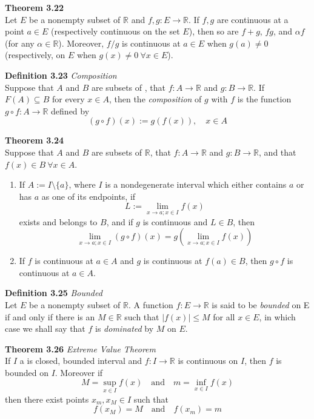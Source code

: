 \documentclass[8pt,landscape]{article}
\begin{document}
\begin{multicols}{3}
    \textbf{Theorem 3.22} \\
    Let $E$ be a nonempty subset of $\mathbb{R}$ and $f, g : E \to \mathbb{R}$.
    If $f, g$ are continuous at a point $a \in E$ (respectively continuous on the set $E$),
    then so are $f+g$, $fg$, and $\alpha f$ (for any $\alpha \in \mathbb{R}$).
    Moreover, $f/g$ is continuous at $a \in E$ when $g(a) \neq 0$
    (respectively, on $E$ when $g(x) \neq 0\ \forall x \in E$).

    \textbf{Definition 3.23} \emph{Composition} \\
    Suppose that $A$ and $B$ are subsets of , that $f : A \to \mathbb{R}$
    and $g : B \to \mathbb{R}$.
    If $F(A) \subseteq B$ for every $x \in A$, then the \emph{composition} of $g$ with $f$
    is the function $g \circ f : A \to \mathbb{R}$ defined by
    \[
        (g \circ f) (x) := g(f(x)), \quad x \in A
    \]

    \textbf{Theorem 3.24} \\
    Suppose that $A$ and $B$ are subsets of $\mathbb{R}$, that $f : A \to \mathbb{R}$
    and $g : B \to \mathbb{R}$, and that $f(x) \in B \ \forall x \in A$.
    \begin{enumerate}
        \item If $A := I \setminus \{a\}$, where $I$ is a nondegenerate interval which
            either contains $a$ or has $a$ as one of its endpoints, if
            \[
                L := \lim_{x \to a; x \in I} f(x)
            \]
            exists and belongs to $B$, and if $g$ is continuous and $L \in B$, then
            \[
                \lim_{x \to a; x \in I} (g \circ f) (x) =
                g \left( \lim_{x \to a; x \in I} f(x)\right)
            \]
        \item If $f$ is continuous at $a \in A$ and $g$ is continuous at $f(a) \in B$,
            then $g \circ f$ is continuous at $a \in A$.
    \end{enumerate}

    \textbf{Definition 3.25} \emph{Bounded} \\
    Let $E$ be a nonempty subset of $\mathbb{R}$.
    A function $f : E \to \mathbb{R}$ is said to be \emph{bounded} on E if and only if
    there is an $M \in \mathbb{R}$ such that $|f(x)| \leq M$ for all $x \in E$, in
    which case we shall say that $f$ is \emph{dominated} by $M$ on $E$.

    \textbf{Theorem 3.26} \emph{Extreme Value Theorem} \\
    If $I$ a is closed, bounded interval and $f : I \to \mathbb{R}$ is continuous on $I$,
    then $f$ is bounded on $I$.
    Moreover if
    \[
        M = \sup_{x \in I} f(x) \quad \text{and} \quad m = \inf_{x \in I} f(x)
    \]
    then there exist points $x_m, x_M \in I$ such that
    \[
        f(x_M) = M \quad \text{and} \quad f(x_m) = m
    \]


\end{multicols}
\end{document}
